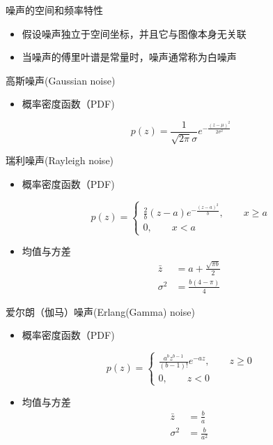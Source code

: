 \documentclass[presentation]{beamer}
\begin{document}
\begin{frame}[label={sec:org34d0613}]{噪声的空间和频率特性}
\begin{itemize}
\item 假设噪声独立于空间坐标，并且它与图像本身无关联
\item 当噪声的傅里叶谱是常量时，噪声通常称为白噪声
\end{itemize}
\end{frame}

\begin{frame}[label={sec:orgc59ed95}]{高斯噪声(Gaussian noise)}
\begin{itemize}
\item 概率密度函数（PDF)
\end{itemize}
\[p(z)=\frac{1}{\sqrt{2\pi}\sigma}e^{-\frac{(z-\mu)^2}{2\sigma^2}}  \]
\end{frame}

\begin{frame}[label={sec:orgf031ce0}]{瑞利噪声(Rayleigh noise)}
\begin{itemize}
\item 概率密度函数（PDF)
\end{itemize}

\[ p(z)=
\begin{cases}
\frac{2}{b}(z-a)e^{-\frac{(z-a)^2}{b}},\qquad  x\geq a \\
0 ,\qquad x<a
\end{cases} \]

\begin{itemize}
\item 均值与方差
\begin{align*}
 \bar z &= a+\frac{\sqrt{\pi b}}{2} \\
 \sigma^2 &=  \frac{b(4-\pi)}{4}
\end{align*}
\end{itemize}
\end{frame}

\begin{frame}[label={sec:org2402f80}]{爱尔朗（伽马）噪声(Erlang(Gamma) noise)}
\begin{itemize}
\item 概率密度函数（PDF)
\end{itemize}
\[ p(z) = 
\begin{cases}
\frac{a^bz^{b-1}}{(b-1)!}e^{-az}, \qquad  z\geq 0 \\
0 , \qquad z<0
\end{cases}  \]

\begin{itemize}
\item 均值与方差
\begin{align*}
 \bar z &= \frac{b}{a} \\
 \sigma^2 &=  \frac{b}{a^2}
\end{align*}
\end{itemize}
\end{frame}
\end{document}
